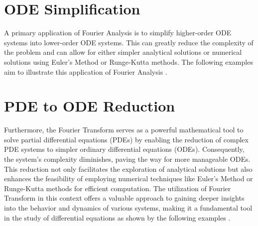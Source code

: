 \section{ODE Simplification}
A primary application of Fourier Analysis is to simplify higher-order ODE systems into lower-order ODE systems. This can greatly reduce the complexity of the problem and can allow for either simpler analytical solutions or numerical solutions using Euler's Method or Runge-Kutta methods. The following examples aim to illustrate this application of Fourier Analysis \citep{Libretexts_2021b}.



% 

\section{PDE to ODE Reduction}
Furthermore, the Fourier Transform serves as a powerful mathematical tool to solve partial differential equations (PDEs) by enabling the reduction of complex PDE systems to simpler ordinary differential equations (ODEs). Consequently, the system's complexity diminishes, paving the way for more manageable ODEs. This reduction not only facilitates the exploration of analytical solutions but also enhances the feasibility of employing numerical techniques like Euler's Method or Runge-Kutta methods for efficient computation. The utilization of Fourier Transform in this context offers a valuable approach to gaining deeper insights into the behavior and dynamics of various systems, making it a fundamental tool in the study of differential equations as shown by the following examples \citep{danchin2005fourier}.








